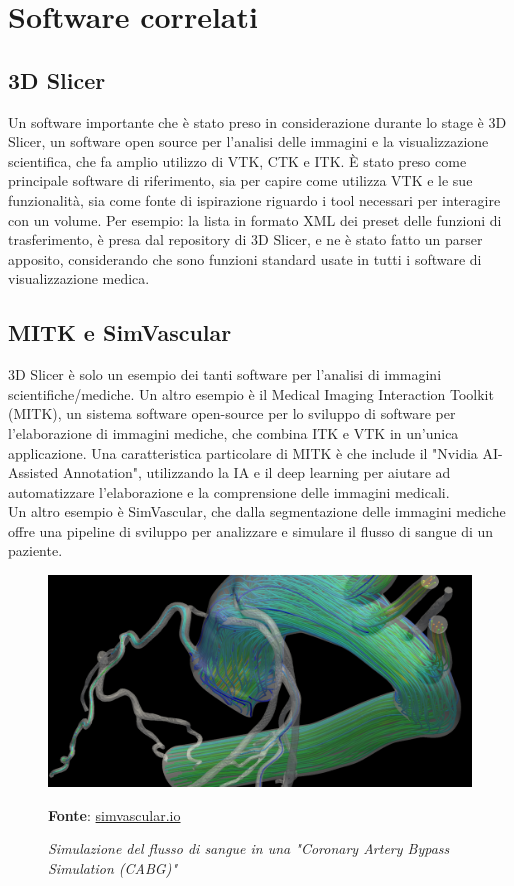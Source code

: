 \section{Software correlati}
\subsection{3D Slicer}
Un software importante che è stato preso in considerazione durante lo stage è 3D Slicer, un software open source per l'analisi delle immagini e la visualizzazione scientifica, che fa amplio utilizzo di VTK, CTK e ITK. \`E stato preso come principale software di riferimento, sia per capire come utilizza VTK e le sue funzionalità, sia come fonte di ispirazione riguardo i tool necessari per interagire con un volume. Per esempio: la lista in formato XML dei preset delle funzioni di trasferimento, è presa dal repository di 3D Slicer, e ne è stato fatto un parser apposito, considerando che sono funzioni standard usate in tutti i software di visualizzazione medica.

\subsection{MITK e SimVascular}
3D Slicer è solo un esempio dei tanti software per l'analisi di immagini scientifiche/mediche. Un altro esempio è il Medical Imaging Interaction Toolkit (MITK), un sistema software open-source per lo sviluppo di software per l'elaborazione di immagini mediche, che combina ITK e VTK in un'unica applicazione. Una caratteristica particolare di MITK è che include il "Nvidia AI-Assisted Annotation", utilizzando la IA e il deep learning per aiutare ad automatizzare l'elaborazione e la comprensione delle immagini medicali.
\\
Un altro esempio è SimVascular, che dalla segmentazione delle immagini mediche offre una pipeline di sviluppo per analizzare e simulare il flusso di sangue di un paziente.
\begin{figure}[h]
    \centering
    \includegraphics[scale=0.15]{immagini/volumerendering/simvascular.png}
    \caption{\textit{Simulazione del flusso di sangue in una "Coronary Artery Bypass Simulation (CABG)"}}
    \textbf{Fonte}: \href{http://simvascular.github.io/}{simvascular.io}
    \label{fig: SimVascular}
\end{figure}


